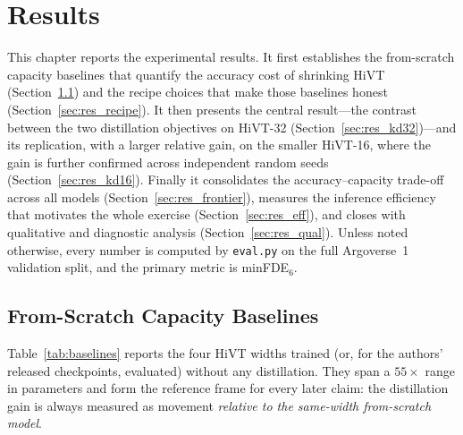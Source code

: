 \chapter{Results}
\label{ch:results}

This chapter reports the experimental results. It first establishes the
from-scratch capacity baselines that quantify the accuracy cost of shrinking HiVT
(Section~\ref{sec:res_baselines}) and the recipe choices that make those baselines
honest (Section~\ref{sec:res_recipe}). It then presents the central result---the
contrast between the two distillation objectives on HiVT-32
(Section~\ref{sec:res_kd32})---and its replication, with a larger relative gain, on
the smaller HiVT-16, where the gain is further confirmed across independent random
seeds (Section~\ref{sec:res_kd16}). Finally it consolidates the
accuracy--capacity trade-off across all models (Section~\ref{sec:res_frontier}),
measures the inference efficiency that motivates the whole exercise
(Section~\ref{sec:res_eff}), and closes with qualitative and diagnostic analysis
(Section~\ref{sec:res_qual}). Unless noted otherwise, every number is computed by
\texttt{eval.py} on the full Argoverse~1 validation split, and the primary metric
is minFDE$_6$.

\section{From-Scratch Capacity Baselines}
\label{sec:res_baselines}

Table~\ref{tab:baselines} reports the four HiVT widths trained (or, for the
authors' released checkpoints, evaluated) without any distillation. They span a
$55\times$ range in parameters and form the reference frame for every later claim:
the distillation gain is always measured as movement \emph{relative to the
same-width from-scratch model}.

